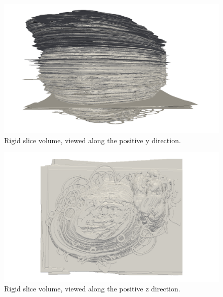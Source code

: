 	\begin{figure}
	  \centering
	  \includegraphics[width=0.9\textheight]{Ch6/Figs/Rat28/contours/whole_positive_y_rigid}
	  \caption{Rigid slice volume, viewed along the positive y direction.}
	  \label{fig:positive_y_rigid_contour}
	\end{figure}

	\begin{figure}
	  \centering
	  \includegraphics[width=0.9\textheight]{Ch6/Figs/Rat28/contours/whole_positive_z_rigid}
	  \caption{Rigid slice volume, viewed along the positive z direction.}
	  \label{fig:positive_z_rigid_contour}
	\end{figure}

